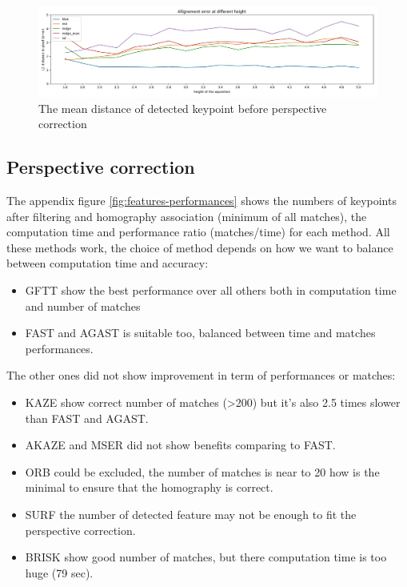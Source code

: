 \documentclass[]{elsarticle}
\begin{document}
	\begin{figure}[H]
	\centering
		\includegraphics[width=0.8\linewidth]{../figures/affine-allignement-rmse.jpg}
		\caption{The mean distance of detected keypoint before perspective correction}
		\label{fig:affine-error}
	\end{figure}
	
	
	\subsection{Perspective correction}
	
	The appendix figure \ref{fig:features-performances} shows the numbers of keypoints after filtering and homography association (minimum of all matches),
	the computation time and performance ratio (matches/time) for each method.
	All these methods work, the choice of method depends on how we want to balance between computation time and accuracy:
	\begin{itemize}
		\item GFTT show the best performance over all others both in computation time and number of matches
		\item FAST and AGAST is suitable too, balanced between time and matches performances.
	\end{itemize}
	
	\noindent
	The other ones did not show improvement in term of performances or matches:
	\begin{itemize}
		\item KAZE show correct number of matches (>200) but it's also 2.5 times slower than FAST and AGAST.
		\item AKAZE and MSER did not show benefits comparing to FAST.
		\item ORB could be excluded, the number of matches is near to 20 how is the minimal to ensure that the homography is correct.
		\item SURF the number of detected feature may not be enough to fit the perspective correction.
		\item BRISK show good number of matches, but there computation time is too huge (79 sec).
	\end{itemize}
	
\end{document}
